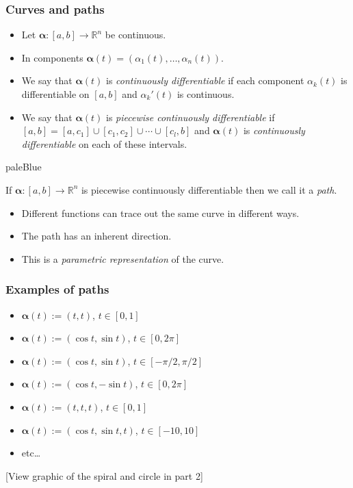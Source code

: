 \documentclass[aspectratio=169,handout]{beamer}
\newcommand{\bR}{\mathbb{R}} %
\newcommand{\aalpha}{\boldsymbol{\alpha}}
\newenvironment{shaded}{\begin{beamercolorbox}[sep=.1em,rounded=true]{paleBlue}}{\end{beamercolorbox}}
\begin{document}
\begin{frame}
    \frametitle{Curves and paths}

    \begin{itemize}
        \item Let \(\aalpha : [a,b] \to \bR^n\) be continuous.
        \item  In components \(\aalpha(t) = (\alpha_1(t),\ldots,\alpha_n(t))\).
        \item  We say that \(\aalpha(t)\) is \emph{continuously differentiable} if each component \(\alpha_k(t)\) is differentiable on \([a,b]\) and \(\alpha_k'(t)\) is continuous.
        \item We say that \(\aalpha(t)\) is \emph{piecewise continuously differentiable} if \([a,b] = [a,c_1]\cup[c_1,c_2] \cup \cdots \cup [c_l,b]\) and \(\aalpha(t)\) is \emph{continuously differentiable} on each of these intervals.
    \end{itemize}

    \begin{shaded}
        \begin{definition}
            If \(\aalpha: [a,b] \to \bR^n\) is piecewise continuously differentiable then we call it a \emph{path}.
        \end{definition}
    \end{shaded}



    \begin{itemize}
        \item     Different functions can trace out the same curve in different ways.
        \item     The path has an inherent direction.
        \item     This is a \emph{parametric representation} of the curve.
    \end{itemize}

\end{frame}

\begin{frame}
    \frametitle{Examples of paths}

    \begin{itemize}
        \item \(\aalpha(t):= (t,t)\), \(t\in[0,1]\)
        \item \(\aalpha(t) := (\cos t, \sin t)\), \(t\in[0,2\pi]\)
        \item \(\aalpha(t) := (\cos t, \sin t)\), \(t\in [-\pi/2,\pi/2]\)
        \item \(\aalpha(t) := (\cos t, -\sin t)\), \(t\in[0,2\pi]\)
        \item \(\aalpha(t):= (t,t,t)\), \(t\in[0,1]\)
        \item \(\aalpha(t):=(\cos t, \sin t, t)\), \(t\in [-10,10]\)
        \item etc\ldots
    \end{itemize}

    [View graphic of the spiral and circle in part 2]

\end{frame}
\end{document}
